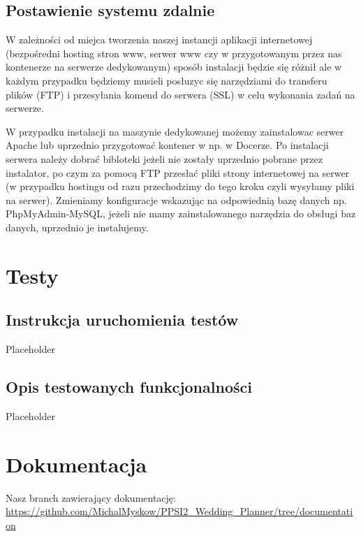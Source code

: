 \documentclass{article}
\begin{document}
\subsection{Postawienie systemu zdalnie}
W zależności od miejca tworzenia naszej instancji aplikacji internetowej (bezpośredni hosting stron www, serwer www czy w przygotowanym przez nas kontenerze na serwerze dedykowanym) sposób instalacji będzie się różnił ale w każdym przypadku będziemy musieli posłuzyc się narzędziami do transferu plików (FTP) i przesyłania komend do serwera (SSL) w celu wykonania zadań na serwerze.

W przypadku instalacji na maszynie dedykowanej możemy zainstalowac serwer Apache lub uprzednio przygotować kontener w np. w Docerze. 
Po instalacji serwera należy dobrać bibloteki jeżeli nie zostały uprzednio pobrane przez instalator, po czym za pomocą FTP przesłać pliki strony internetowej na serwer (w przypadku hostingu od razu przechodzimy do tego kroku czyli wysyłamy pliki na serwer).
Zmieniamy konfiguracje wskazując na odpowiednią bazę danych np. PhpMyAdmin-MySQL, jeżeli nie mamy zainstalowanego narzędzia do obsługi baz danych, uprzednio je instalujemy.
\section{Testy}
\subsection{Instrukcja uruchomienia testów}
Placeholder
\subsection{Opis testowanych funkcjonalności}
Placeholder
\section{Dokumentacja}
Nasz branch zawierający dokumentację: 
\url{https://github.com/MichalMyskow/PPSI2_Wedding_Planner/tree/documentation}\\\\
\end{document}
